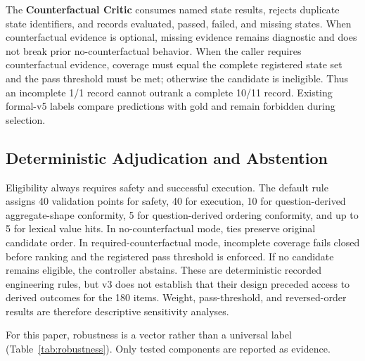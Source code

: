\documentclass[applsci,article,submit,moreauthors]{Definitions/mdpi}
\begin{document}
The \textbf{Counterfactual Critic} consumes named state results, rejects duplicate state identifiers, and records evaluated, passed, failed, and missing states. When counterfactual evidence is optional, missing evidence remains diagnostic and does not break prior no-counterfactual behavior. When the caller requires counterfactual evidence, coverage must equal the complete registered state set and the pass threshold must be met; otherwise the candidate is ineligible. Thus an incomplete 1/1 record cannot outrank a complete 10/11 record. Existing formal-v5 labels compare predictions with gold and remain forbidden during selection.

\subsection{Deterministic Adjudication and Abstention}

Eligibility always requires safety and successful execution. The default rule assigns 40 validation points for safety, 40 for execution, 10 for question-derived aggregate-shape conformity, 5 for question-derived ordering conformity, and up to 5 for lexical value hits. In no-counterfactual mode, ties preserve original candidate order. In required-counterfactual mode, incomplete coverage fails closed before ranking and the registered pass threshold is enforced. If no candidate remains eligible, the controller abstains. These are deterministic recorded engineering rules, but v3 does not establish that their design preceded access to derived outcomes for the 180 items. Weight, pass-threshold, and reversed-order results are therefore descriptive sensitivity analyses.

For this paper, robustness is a vector rather than a universal label (Table~\ref{tab:robustness}). Only tested components are reported as evidence.
\end{document}
